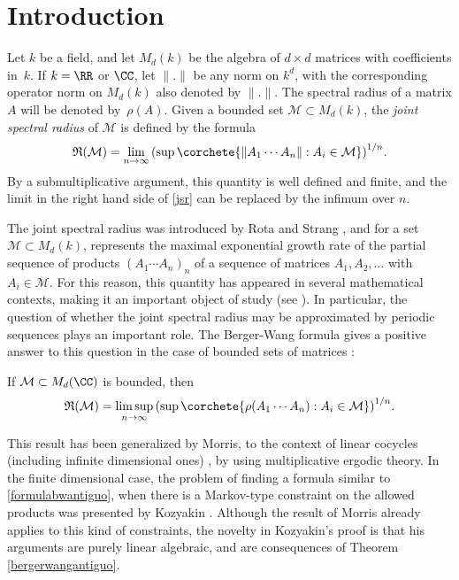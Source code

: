 \section{Introduction}
Let $k$ be a field, and let $M_{d}(k)$ be the algebra of $d\times d$ matrices with coefficients in~$k$. If $k=\RR$ or $\CC$, let $\|.\|$ be any norm on $k^d$, with the corresponding operator norm on $M_{d}(k)$ also denoted by $\|.\|$. The spectral radius of a matrix $A$ will be denoted by~$\rho(A)$. Given a bounded set $\mathcal{M}\subset M_{d}(k)$, the \textit{joint spectral radius} of $\mathcal{M}$ is defined by the formula
\begin{equation}\label{jsr}
\mathfrak{R}(\mathcal{M})=\lim_{n\to \infty}{\left(\sup \corchete{\|A_{1}\cdots A_{n}\| : A_{i}\in \mathcal{M} }\right)^{1/n}}.
\end{equation}
By a submultiplicative argument, this quantity is well defined and finite, and the limit in the right hand side of \eqref{jsr} can be replaced by the infimum over $n$.

The joint spectral radius was introduced by Rota and Strang \cite{rota}, and for a set $\mathcal{M}\subset M_{d}(k)$, represents the maximal exponential growth rate of the partial sequence of products $(A_1\cdots A_n)_{n}$ of a sequence of matrices $A_1,A_2,\dots$ with $A_i\in \mathcal{M}$. For this reason, this quantity has appeared in several mathematical contexts, making it an important object of study (see \eg \cite{gur,jun,mathermorris,tsblo}). In particular, the question of whether the joint spectral radius may be approximated by periodic sequences plays an important role. The Berger-Wang formula gives a positive answer to this question in the case of bounded sets of matrices \cite{bw}:

\begin{teo}\label{bergerwangantiguo}
If $\mathcal{M}\subset M_{d}(\CC)$ is bounded, then
\begin{equation}\label{formulabwantiguo}
\mathfrak{R}(\mathcal{M})=\limsup_{n\to \infty}{\left(\sup\corchete{\rho(A_{1}\cdots A_{n}) : A_{i}\in \mathcal{M}}\right)^{1/n}}.
\end{equation}
\end{teo}
This result has been generalized by Morris, to the context of linear cocycles (including infinite dimensional ones) \cite{morrisbw}, by using multiplicative ergodic theory. In the finite dimensional case, the problem of finding a formula similar to \eqref{formulabwantiguo}, when there is a Markov-type constraint on the allowed products was presented by Kozyakin \cite{kozyakin}. Although the result of Morris already applies to this kind of constraints, the novelty in Kozyakin's proof is that his arguments are purely linear algebraic, and are consequences of Theorem \ref{bergerwangantiguo}.

